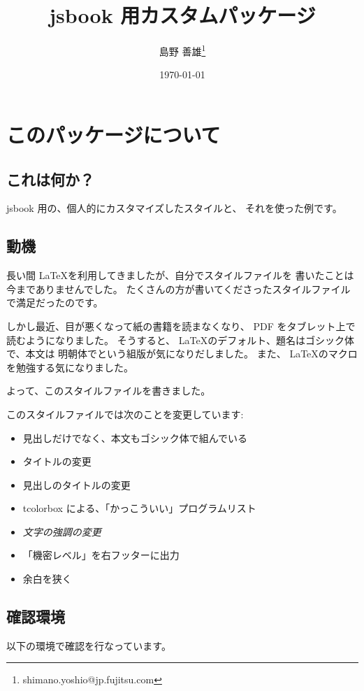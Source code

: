 \documentclass[dvipdfmx,a4j,14pt,uplatex,openany]{jsbook}
\author{島野 善雄\thanks{shimano.yoshio@jp.fujitsu.com}}
\date{\today}
\title{jsbook 用カスタムパッケージ}
\begin{document}
\maketitle
\setcounter{tocdepth}{4}
\tableofcontents

\color{Black!95!White}
\chapter{このパッケージについて}
\label{sec:orga40a41a}
\section{これは何か？}
\label{sec:org49fd5c8}
jsbook 用の、個人的にカスタマイズしたスタイルと、
それを使った例です。


\section{動機}
\label{sec:org55e37b0}
長い間 \LaTeX を利用してきましたが、自分でスタイルファイルを
書いたことは今までありませんでした。
たくさんの方が書いてくださったスタイルファイルで満足だったのです。

しかし最近、目が悪くなって紙の書籍を読まなくなり、 PDF をタブレット上で
読むようになりました。
そうすると、 \LaTeX のデフォルト、題名はゴシック体で、本文は
明朝体でという組版が気になりだしました。
また、 \LaTeX のマクロを勉強する気になりました。

よって、このスタイルファイルを書きました。

このスタイルファイルでは次のことを変更しています:

\begin{itemize}
\item 見出しだけでなく、本文もゴシック体で組んでいる
\item タイトルの変更
\item 見出しのタイトルの変更
\item tcolorbox による、「かっこういい」プログラムリスト
\item \emph{文字の強調の変更}
\item 「機密レベル」を右フッターに出力
\item 余白を狭く
\end{itemize}

\section{確認環境}
\label{sec:orgc87ffe5}
以下の環境で確認を行なっています。
\end{document}

